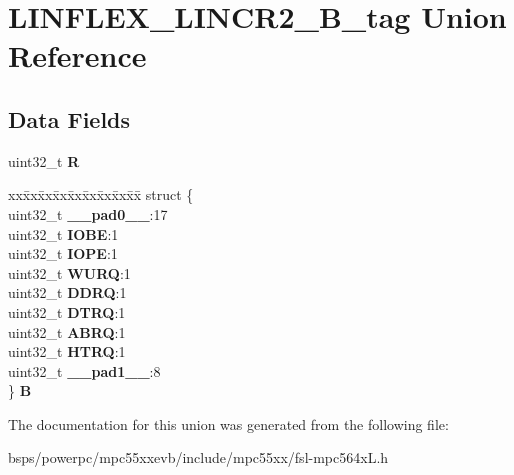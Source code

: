 \hypertarget{unionLINFLEX__LINCR2__32B__tag}{}\section{L\+I\+N\+F\+L\+E\+X\+\_\+\+L\+I\+N\+C\+R2\+\_\+B\+\_\+tag Union Reference}
\label{unionLINFLEX__LINCR2__32B__tag}
\subsection*{Data Fields}
\begin{DoxyCompactItemize}
\item 
\mbox{\label{unionLINFLEX__LINCR2__32B__tag_a23384c414c49ebe3a9ecc6fcc1d149f7}} 
uint32\+\_\+t {\bfseries R}
\item 
\mbox{\label{unionLINFLEX__LINCR2__32B__tag_ae887598eb39b7d8d9f787accaa88bdcd}} 
\begin{tabbing}
xx\=xx\=xx\=xx\=xx\=xx\=xx\=xx\=xx\=\kill
struct \{\\
\>uint32\_t {\bfseries \_\_pad0\_\_}:17\\
\>uint32\_t {\bfseries IOBE}:1\\
\>uint32\_t {\bfseries IOPE}:1\\
\>uint32\_t {\bfseries WURQ}:1\\
\>uint32\_t {\bfseries DDRQ}:1\\
\>uint32\_t {\bfseries DTRQ}:1\\
\>uint32\_t {\bfseries ABRQ}:1\\
\>uint32\_t {\bfseries HTRQ}:1\\
\>uint32\_t {\bfseries \_\_pad1\_\_}:8\\
\} {\bfseries B}\\

\end{tabbing}\end{DoxyCompactItemize}


The documentation for this union was generated from the following file\+:\begin{DoxyCompactItemize}
\item 
bsps/powerpc/mpc55xxevb/include/mpc55xx/fsl-\/mpc564x\+L.\+h\end{DoxyCompactItemize}
